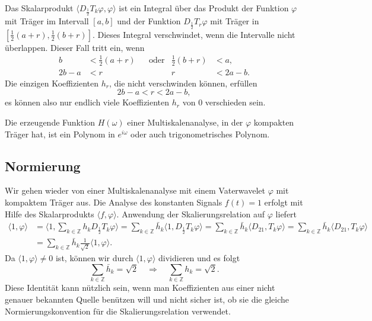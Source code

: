 Das Skalarprodukt
$\langle D_{\frac12}T_k\varphi, \varphi \rangle$
ist ein Integral über das Produkt der Funktion $\varphi$ mit Träger im Intervall
$[a,b]$ und der Funktion $D_{\frac12}T_r\varphi$  mit Träger in
$[\frac12(a+r),\frac12(b+r)]$.
Dieses Integral verschwindet, wenn die Intervalle nicht überlappen.
Dieser Fall tritt ein, wenn
\[
\begin{aligned}
b&<\frac12(a+r) &&\text{oder}& \frac12(b+r) &< a,
\\
2b-a&<r         &&           &            r &< 2a-b.
\end{aligned}
\]
Die einzigen Koeffizienten $h_r$, die nicht verschwinden können, erfüllen
\[
2b-a < r < 2a-b,
\]
es können also nur endlich viele Koeffizienten $h_r$ von $0$ verschieden
sein.

\begin{konsequenz}
Die erzeugende Funktion $H(\omega)$ einer Multiskalenanalyse, in der
$\varphi$ kompakten Träger hat, ist ein Polynom in $e^{i\omega}$ oder auch
trigonometrisches Polynom.
\end{konsequenz}

\subsection{Normierung}
%
Wir gehen wieder von einer Multiskalenanalyse mit einem Vaterwavelet
$\varphi$ mit kompaktem Träger aus.
Die Analyse des konstanten Signals $f(t)=1$ erfolgt mit Hilfe des
Skalarprodukts $\langle f,\varphi\rangle$.
Anwendung der Skalierungsrelation auf $\varphi$ liefert
\begin{align*}
\langle 1,\varphi\rangle
&=
\biggl\langle
1,\sum_{k\in\mathbb Z} h_kD_{\frac12}T_k\varphi
\biggr\rangle
=
\sum_{k\in\mathbb Z}
\bar{h}_k
\langle
1,
D_{\frac12}T_k\varphi
\rangle
=
\sum_{k\in\mathbb Z}
\bar{h}_k
\langle
D_21,
T_k\varphi
\rangle
=
\sum_{k\in\mathbb Z}
\bar{h}_k
\langle
D_21,
T_k\varphi
\rangle
\\
&=
\sum_{k\in\mathbb Z}
\bar{h}_k
\frac{1}{\sqrt{2}}
\langle 1,\varphi\rangle.
\end{align*}
Da $\langle 1,\varphi\rangle\ne 0$ ist, können wir durch
$\langle 1,\varphi\rangle$ dividieren und es folgt
\begin{equation}
\sum_{k\in\mathbb Z} \bar{h}_k = \sqrt{2}
\quad\Rightarrow\quad
\sum_{k\in\mathbb Z} h_k = \sqrt{2}.
\label{buch:kompakt:hsumme}
\end{equation}
Diese Identität kann nützlich sein, wenn man Koeffizienten aus einer
nicht genauer bekannten Quelle benützen will und nicht sicher ist,
ob sie die gleiche Normierungskonvention für die Skalierungsrelation
verwendet.

